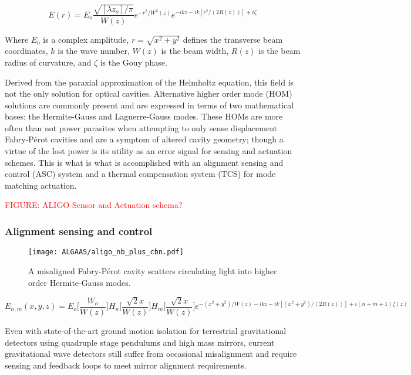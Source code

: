 \begin{equation}\label{eq:gaussian_beam}
E(r) = E_o \frac{\sqrt{[\lambda z_o] / \pi}}{W(z)}e^{-r^2 / W^2(z)} e^{-ikz - ik[r^2 / (2R(z))] + i \zeta}
\end{equation}

Where $E_o$ is a complex amplitude, $r = \sqrt{x^2 + y^2}$ defines the transverse beam coordinates, $k$ is the wave number, $W(z)$ is the beam width, $R(z)$ is the beam radius of curvature, and $\zeta$ is the Gouy phase.

Derived from the paraxial approximation of the Helmholtz equation, this field is not the only solution for optical cavities. Alternative higher order mode (HOM) solutions are commonly present and are expressed in terms of two mathematical bases: the Hermite-Gauss and Laguerre-Gauss modes. These HOMs are more often than not power parasites when attempting to only sense displacement Fabry-P\'{e}rot cavities and are a symptom of altered cavity geometry; though a virtue of the lost power is its utility as an error signal for sensing and actuation schemes. This is what is what is accomplished with an alignment sensing and control (ASC) system and a thermal compensation system (TCS) for mode matching actuation.

\textcolor{red}{FIGURE: ALIGO Sensor and Actuation schema?}

\subsubsection{Alignment sensing and control}

\begin{figure}[H]
    \begin{center}
    \texttt{[image: ALGAAS/aligo\_nb\_plus\_cbn.pdf]}
    \end{center}
    \caption{A misaligned Fabry-P\'{e}rot cavity scatters circulating light into higher order Hermite-Gauss modes.}
\label{fig:aligo_tn_comparison}
\end{figure}

\begin{equation}
	E_{n,m}(x,y,z) = E_o \bigg[ \frac{W_o}{W(z)} \bigg] H_n \bigg[ \frac{\sqrt{2}x}{W(z)} \bigg] H_m \bigg[ \frac{\sqrt{2}x}{W(z)} \bigg] e^{-(x^2 + y^2)/W(z) - ikz - ik[(x^2 + y^2)/(2R(z))] + i(n + m + 1)\zeta(z)}
\end{equation}

Even with state-of-the-art ground motion isolation for terrestrial gravitational detectors using quadruple stage pendulums and high mass mirrors, current gravitational wave detectors still suffer from occasional misalignment and require sensing and feedback loops to meet mirror alignment requirements.

